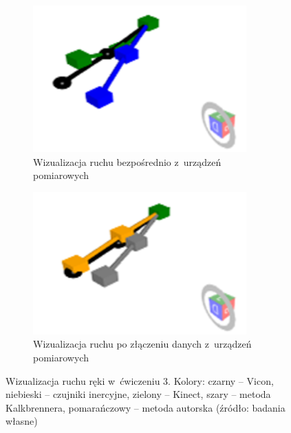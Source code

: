 \begin{figure}[!htb]
	\captionsetup{singlelinecheck=off}
	\centering
	\begin{subfigure}[b]{0.48\textwidth}
		\centering
		\includegraphics[width=0.9\textwidth]{images/300/raw.png}	
		\caption{Wizualizacja ruchu bezpośrednio z~urządzeń pomiarowych}
		\label{fig:experiments:th:raw}
	\end{subfigure}
	\hfill																																				
	\begin{subfigure}[b]{0.48\textwidth}
		\centering
		\includegraphics[width=0.9\textwidth]{images/300/Fused.png}		
		\caption{Wizualizacja ruchu po złączeniu danych z~urządzeń pomiarowych}
		\label{fig:experiments:th:fused}	
	\end{subfigure}
																																											
	\caption[Wizualizacja ruchu ręki w~ćwiczeniu 3]{Wizualizacja ruchu ręki w~ćwiczeniu 3.  Kolory: czarny -- Vicon, niebieski -- czujniki inercyjne, zielony -- Kinect, szary -- metoda Kalkbrennera, pomarańczowy -- metoda autorska (źródło: badania własne)}	
	\label{fig:experiments:th}
\end{figure}
																				
